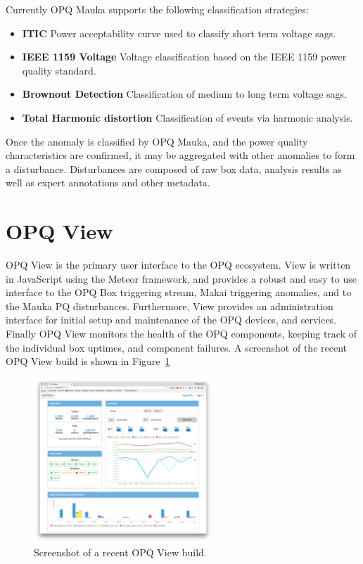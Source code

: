 Currently OPQ Mauka supports the following classification strategies: 
\begin{itemize}
	\item{\textbf{ITIC}} Power acceptability curve used to classify short term voltage sags.
	\item{\textbf{IEEE 1159 Voltage}} Voltage classification based on the IEEE 1159 power quality standard.
	\item{\textbf{Brownout Detection}} Classification of medium to long term voltage sags.
	\item{\textbf{Total Harmonic distortion}} Classification of events via harmonic analysis.
\end{itemize}

Once the anomaly is classified by OPQ Mauka, and the power quality characteristics are confirmed, it may be aggregated with other anomalies to form a disturbance.
Disturbances are composed of raw box data, analysis results as well as expert annotations and other metadata.

\section{OPQ View}\label{sec:opq-view}

OPQ View is the primary user interface to the OPQ ecosystem.
View is written in JavaScript using the Meteor framework, and provides a robust and easy to use interface to the OPQ Box triggering stream, Makai triggering anomalies, and to the Mauka PQ disturbances.
Furthermore, View provides an administration interface for initial setup and maintenance of the OPQ devices, and services.
Finally OPQ View monitors the health of the OPQ components, keeping track of the individual box uptimes, and component failures.
A screenshot of the recent OPQ View build is shown in Figure~\ref{fig:opq:12}

\begin{figure}[h]
  \begin{center}
  \includegraphics[width=0.6\textwidth]{img/opqview-landing-page.png}
  \end{center}
  \caption{Screenshot of a recent OPQ View build.}
  \label{fig:opq:12}
\end{figure}
